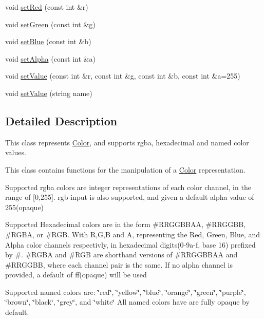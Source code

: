 \begin{DoxyCompactItemize}
\item 
void \hyperlink{classbridges_1_1_color_a56ff7cf20ccf252ed5fd9d1836693c42}{set\+Red} (const int \&r)
\item 
void \hyperlink{classbridges_1_1_color_ad7522440e9772446b66d699cda307704}{set\+Green} (const int \&g)
\item 
void \hyperlink{classbridges_1_1_color_abbde3c596c48b1870a305164b51dc9b5}{set\+Blue} (const int \&b)
\item 
void \hyperlink{classbridges_1_1_color_af2ab47aa5ccafb74be9ef8e6042093a1}{set\+Alpha} (const int \&a)
\item 
void \hyperlink{classbridges_1_1_color_a1bbb6b478ac6a013d04951f564bab70d}{set\+Value} (const int \&r, const int \&g, const int \&b, const int \&a=255)
\item 
void \hyperlink{classbridges_1_1_color_aa6e1db9aa47275ef829ac0fa96d72190}{set\+Value} (string name)
\end{DoxyCompactItemize}


\subsection{Detailed Description}
This class represents \hyperlink{classbridges_1_1_color}{Color}, and supports rgba, hexadecimal and named color values. 

This class contains functions for the manipulation of a \hyperlink{classbridges_1_1_color}{Color} representation.

Supported rgba colors are integer representations of each color channel, in the range of \mbox{[}0,255\mbox{]}. rgb input is also supported, and given a default alpha value of 255(opaque)

Supported Hexadecimal colors are in the form \#\+R\+R\+G\+G\+B\+B\+AA, \#\+R\+R\+G\+G\+BB, \#\+R\+G\+BA, or \#\+R\+GB. With R,G,B and A, representing the Red, Green, Blue, and Alpha color channels respectivly, in hexadecimal digits(0-\/9a-\/f, base 16) prefixed by \textquotesingle{}\#\textquotesingle{}. \#\+R\+G\+BA and \#\+R\+GB are shorthand versions of \#\+R\+R\+G\+G\+B\+B\+AA and \#\+R\+R\+G\+G\+BB, where each channel pair is the same. If no alpha channel is provided, a default of \textquotesingle{}ff\textquotesingle{}(opaque) will be used

Supported named colors are\+: \char`\"{}red\char`\"{}, \char`\"{}yellow\char`\"{}, \char`\"{}blue\char`\"{}, \char`\"{}orange\char`\"{}, \char`\"{}green\char`\"{}, \char`\"{}purple\char`\"{}, \char`\"{}brown\char`\"{}, \char`\"{}black\char`\"{}, \char`\"{}grey\char`\"{}, and \char`\"{}white\char`\"{} All named colors have are fully opaque by default.

